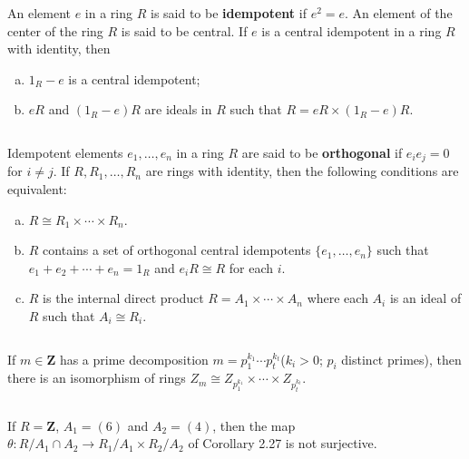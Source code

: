 $$ $$

\begin{ex}
    An element $e$ in a ring $R$ is said to be \textbf{idempotent} if $e^{2}=e$. An element  of the center of the ring $R$ is said to be central. If $e$ is a central idempotent in a ring $R$ with identity, then
    \begin{enumerate}[(a)]
        \item $1_{R}-e$ is a central idempotent;
        \item $eR$ and $(1_{R}-e)R$ are ideals in $R$ such that $R=eR\times (1_{R}-e)R$.
    \end{enumerate}
\end{ex}

$$ $$

\begin{ex}
    Idempotent elements $e_{1},\dots,e_{n}$ in a ring $R$ are said to be \textbf{orthogonal} if $e_{i}e_{j}=0$ for $i\neq j$. If $R,R_{1},\dots, R_{n}$ are rings with identity, then the following conditions are equivalent:
    \begin{enumerate}[(a)]
        \item $R\cong R_{1}\times \cdots\times R_{n}$.
        \item $R$ contains a set of orthogonal central idempotents $\{e_{1}, \dots, e_{n}\}$ such that $e_{1}+e_{2}+\cdots+e_{n}=1_{R}$ and $e_{i}R\cong R$ for each $i$.
        \item $R$ is the internal direct product $R=A_{1}\times \cdots\times A_{n}$ where each $A_{i}$ is an ideal of $R$ such that $A_{i}\cong R_{i}$.
    \end{enumerate}
\end{ex}

$$ $$

\begin{ex}
    If $m\in \mathbf{Z}$ has a prime decomposition $m=p_{1}^{k_{1}}\cdots p_{t}^{k_{t}}$($k_{i}>0$; $p_{i}$ distinct primes), then there is an isomorphism of rings $Z_{m}\cong Z_{p_{1}^{k_{1}}}\times \cdots\times Z_{p_{t}^{k_{t}}}$.
\end{ex}

$$ $$

\begin{ex}
    If $R=\mathbf{Z}$, $A_{1}=(6)$ and $A_{2}=(4)$, then the map $\theta :R /A_{1}\cap A_{2}\to R_{1} /A_{1}\times R_{2} /A_{2}$ of Corollary 2.27 is not surjective.
\end{ex}